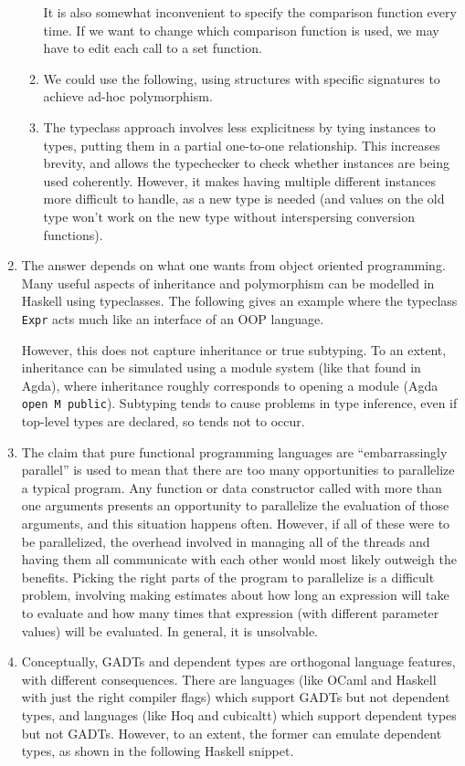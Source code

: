 \documentclass{article}
\begin{document}
\begin{enumerate}
\begin{enumerate}
        It is also somewhat inconvenient to specify the comparison function every time. If we want to change which comparison function is used, we may have to edit each call to a set function.
      \item We could use the following, using structures with specific signatures to achieve ad-hoc polymorphism.
        
      \item The typeclass approach involves less explicitness by tying instances to types, putting them in a partial one-to-one relationship. This increases brevity, and allows the typechecker to check whether instances are being used coherently. However, it makes having multiple different instances more difficult to handle, as a new type is needed (and values on the old type won't work on the new type without interspersing conversion functions).
    \end{enumerate}
  \item The answer depends on what one wants from object oriented programming. Many useful aspects of inheritance and polymorphism can be modelled in Haskell using typeclasses. The following gives an example where the typeclass \texttt{Expr} acts much like an interface of an OOP language.
    
    However, this does not capture inheritance or true subtyping. To an extent, inheritance can be simulated using a module system (like that found in Agda), where inheritance roughly corresponds to opening a module (Agda \texttt{open M public}). Subtyping tends to cause problems in type inference, even if top-level types are declared, so tends not to occur.
  \item The claim that pure functional programming languages are ``embarrassingly parallel'' is used to mean that there are too many opportunities to parallelize a typical program. Any function or data constructor called with more than one arguments presents an opportunity to parallelize the evaluation of those arguments, and this situation happens often. However, if all of these were to be parallelized, the overhead involved in managing all of the threads and having them all communicate with each other would most likely outweigh the benefits. Picking the right parts of the program to parallelize is a difficult problem, involving making estimates about how long an expression will take to evaluate and how many times that expression (with different parameter values) will be evaluated. In general, it is unsolvable.
  \item Conceptually, GADTs and dependent types are orthogonal language features, with different consequences. There are languages (like OCaml and Haskell with just the right compiler flags) which support GADTs but not dependent types, and languages (like Hoq and cubicaltt) which support dependent types but not GADTs. However, to an extent, the former can emulate dependent types, as shown in the following Haskell snippet.

\end{enumerate}
\end{document}
